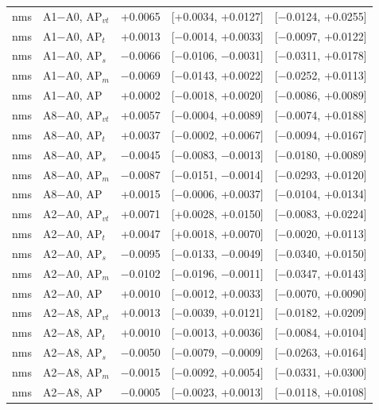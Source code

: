 \begin{tabular}{llrcc}
\midrule
nms & A1$-$A0, AP$_{vt}$ & +0.0065 & [+0.0034, +0.0127] & [$-$0.0124, +0.0255] \\
nms & A1$-$A0, AP$_{t}$ & +0.0013 & [$-$0.0014, +0.0033] & [$-$0.0097, +0.0122] \\
nms & A1$-$A0, AP$_{s}$ & $-$0.0066 & [$-$0.0106, $-$0.0031] & [$-$0.0311, +0.0178] \\
nms & A1$-$A0, AP$_{m}$ & $-$0.0069 & [$-$0.0143, +0.0022] & [$-$0.0252, +0.0113] \\
nms & A1$-$A0, AP & +0.0002 & [$-$0.0018, +0.0020] & [$-$0.0086, +0.0089] \\
nms & A8$-$A0, AP$_{vt}$ & +0.0057 & [$-$0.0004, +0.0089] & [$-$0.0074, +0.0188] \\
nms & A8$-$A0, AP$_{t}$ & +0.0037 & [$-$0.0002, +0.0067] & [$-$0.0094, +0.0167] \\
nms & A8$-$A0, AP$_{s}$ & $-$0.0045 & [$-$0.0083, $-$0.0013] & [$-$0.0180, +0.0089] \\
nms & A8$-$A0, AP$_{m}$ & $-$0.0087 & [$-$0.0151, $-$0.0014] & [$-$0.0293, +0.0120] \\
nms & A8$-$A0, AP & +0.0015 & [$-$0.0006, +0.0037] & [$-$0.0104, +0.0134] \\
nms & A2$-$A0, AP$_{vt}$ & +0.0071 & [+0.0028, +0.0150] & [$-$0.0083, +0.0224] \\
nms & A2$-$A0, AP$_{t}$ & +0.0047 & [+0.0018, +0.0070] & [$-$0.0020, +0.0113] \\
nms & A2$-$A0, AP$_{s}$ & $-$0.0095 & [$-$0.0133, $-$0.0049] & [$-$0.0340, +0.0150] \\
nms & A2$-$A0, AP$_{m}$ & $-$0.0102 & [$-$0.0196, $-$0.0011] & [$-$0.0347, +0.0143] \\
nms & A2$-$A0, AP & +0.0010 & [$-$0.0012, +0.0033] & [$-$0.0070, +0.0090] \\
nms & A2$-$A8, AP$_{vt}$ & +0.0013 & [$-$0.0039, +0.0121] & [$-$0.0182, +0.0209] \\
nms & A2$-$A8, AP$_{t}$ & +0.0010 & [$-$0.0013, +0.0036] & [$-$0.0084, +0.0104] \\
nms & A2$-$A8, AP$_{s}$ & $-$0.0050 & [$-$0.0079, $-$0.0009] & [$-$0.0263, +0.0164] \\
nms & A2$-$A8, AP$_{m}$ & $-$0.0015 & [$-$0.0092, +0.0054] & [$-$0.0331, +0.0300] \\
nms & A2$-$A8, AP & $-$0.0005 & [$-$0.0023, +0.0013] & [$-$0.0118, +0.0108] \\
\bottomrule
\end{tabular}
